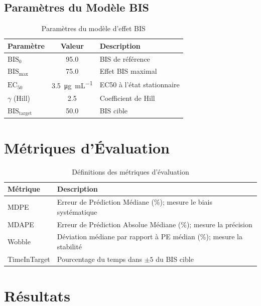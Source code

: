 \documentclass[12pt,a4paper]{article}
\begin{document}
\subsection{Paramètres du Modèle BIS}

\begin{table}[htbp]
    \centering
    \caption{Paramètres du modèle d'effet BIS}
    \begin{tabular}{lcl}
        \toprule
        \textbf{Paramètre} & \textbf{Valeur} & \textbf{Description} \\
        \midrule
        $\text{BIS}_0$ & 95.0 & BIS de référence \\
        $\text{BIS}_{\max}$ & 75.0 & Effet BIS maximal \\
        $\text{EC}_{50}$ & \SI{3.5}{\micro\gram\per\mL} & EC50 à l'état stationnaire \\
        $\gamma$ (Hill) & 2.5 & Coefficient de Hill \\
        $\text{BIS}_{\text{target}}$ & 50.0 & BIS cible \\
        \bottomrule
    \end{tabular}
\end{table}

\clearpage

\section{Métriques d'Évaluation}

\begin{table}[htbp]
    \centering
    \caption{Définitions des métriques d'évaluation}
    \begin{tabular}{lp{10cm}}
        \toprule
        \textbf{Métrique} & \textbf{Description} \\
        \midrule
        MDPE & Erreur de Prédiction Médiane (\%); mesure le biais systématique \\
        MDAPE & Erreur de Prédiction Absolue Médiane (\%); mesure la précision \\
        Wobble & Déviation médiane par rapport à PE médian (\%); mesure la stabilité \\
        TimeInTarget & Pourcentage du temps dans $\pm5$ du BIS cible \\
        \bottomrule
    \end{tabular}
\end{table}

\section{Résultats}
\end{document}
